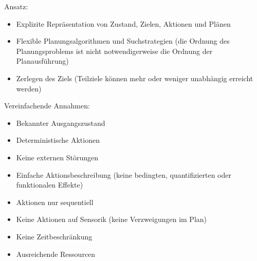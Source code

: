 Ansatz:
\begin{itemize}
	\item Explizite Repräsentation von Zustand, Zielen, Aktionen und Plänen
	\item Flexible Planungsalgorithmen und Suchstrategien (die Ordnung des Planungsproblems ist nicht notwendigerweise die Ordnung der Planausführung)
	\item Zerlegen des Ziels (Teilziele können mehr oder weniger unabhängig erreicht werden)
\end{itemize}

Vereinfachende Annahmen:
\begin{itemize}
	\item Bekannter Ausgangszustand
	\item Deterministische Aktionen
	\item Keine externen Störungen
	\item Einfache Aktionsbeschreibung (keine bedingten, quantifizierten oder funktionalen Effekte)
	\item Aktionen nur sequentiell
	\item Keine Aktionen auf Sensorik (keine Verzweigungen im Plan)
	\item Keine Zeitbeschränkung
	\item Ausreichende Ressourcen
\end{itemize}


